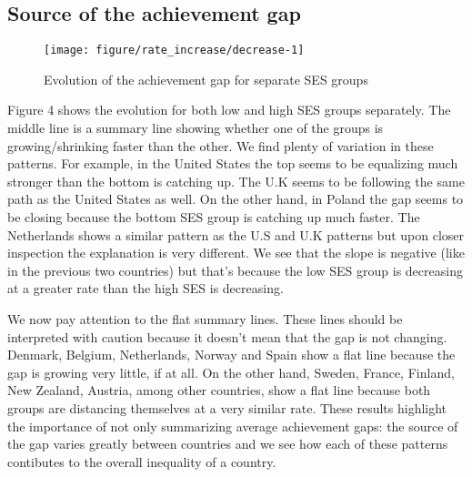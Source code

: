 \documentclass[11pt, a4paper]{article}\usepackage[]{graphicx}\usepackage[]{color}
\begin{document}
\subsection{Source of the achievement gap}

\begin{figure}

{\centering \texttt{[image: figure/rate\_increase/decrease-1]} 

}

\caption[Evolution of the achievement gap for separate SES groups]{Evolution of the achievement gap for separate SES groups}\label{fig:rate_increase/decrease}
\end{figure}



Figure 4 shows the evolution for both low and high SES groups separately. The middle line is a summary line showing whether one of the groups is growing/shrinking faster than the other. We find plenty of variation in these patterns. For example, in the United States the top seems to be equalizing much stronger than the bottom is catching up. The U.K seems to be following the same path as the United States as well. On the other hand, in Poland the gap seems to be closing because the bottom SES group is catching up much faster. The Netherlands shows a similar pattern as the U.S and U.K patterns but upon closer inspection the explanation is very different. We see that the slope is negative (like in the previous two countries) but that's because the low SES group is decreasing at a greater rate than the high SES is decreasing.

We now pay attention to the flat summary lines. These lines should be interpreted with caution because it doesn't mean that the gap is not changing. Denmark, Belgium, Netherlands, Norway and Spain show a flat line because the gap is growing very little, if at all. On the other hand, Sweden, France, Finland, New Zealand, Austria, among other countries, show a flat line because both groups are distancing themselves at a very similar rate. These results highlight the importance of not only summarizing average achievement gaps: the source of the gap varies greatly between countries and we see how each of these patterns contibutes to the overall inequality of a country.
\end{document}

